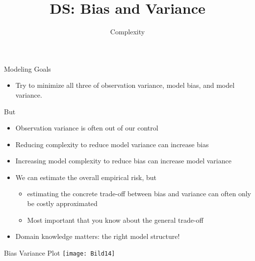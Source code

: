 \documentclass[aspectratio=169]{../latex_main/tntbeamer}  %
\title[Statistics]{DS: Bias and Variance}
\subtitle{Complexity}
\begin{document}
	
	\maketitle
	\begin{frame}[c]{Modeling Goals}
	    \begin{itemize}
	        \item Try to minimize all three of observation variance, model bias, and model variance.
	    \end{itemize}
	    But
	    \begin{itemize}
	        \item Observation variance is often out of our control
	        \item Reducing complexity to reduce model variance can increase bias
	        \item Increasing model complexity to reduce bias can increase model variance
	        \item We can estimate the overall empirical risk, but
	        \begin{itemize}
	           \item estimating the concrete trade-off between bias and variance can often only be costly approximated
	           \item Most important that you know about the general trade-off
	        \end{itemize}
	        \item \alert{Domain knowledge matters:} the right model structure!

	        
	    \end{itemize}
	\end{frame}
	
	
	\begin{frame}{Bias Variance Plot}
	    \centering
	    \texttt{[image: Bild14]}
	\end{frame}
	
\end{document}

